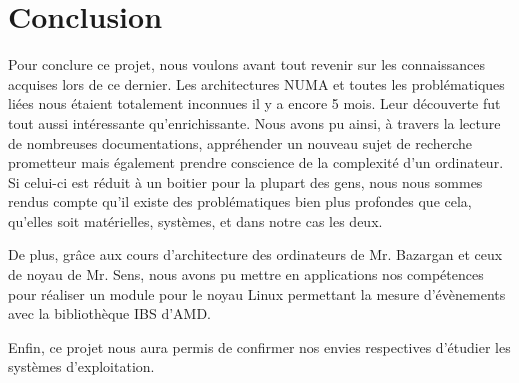 \pagestyle{plain}
\chapter*{Conclusion}

  Pour conclure ce projet, nous voulons avant tout revenir sur les connaissances
  acquises lors de ce dernier. Les architectures NUMA et toutes les
  problématiques liées nous étaient totalement inconnues il y a encore 5
  mois. Leur découverte fut tout aussi intéressante qu'enrichissante. Nous avons
  pu ainsi, à travers la lecture de nombreuses documentations, appréhender un
  nouveau sujet de recherche prometteur mais également prendre conscience de la
  complexité d'un ordinateur. Si celui-ci est réduit à un boitier pour la
  plupart des gens, nous nous sommes rendus compte qu'il existe des
  problématiques bien plus profondes que cela, qu'elles soit matérielles,
  systèmes, et dans notre cas les deux.\newline

  De plus, grâce aux cours d'architecture des ordinateurs de Mr. Bazargan et
  ceux de noyau de Mr. Sens, nous avons pu mettre en applications nos
  compétences pour réaliser un module pour le noyau Linux permettant la mesure
  d'évènements avec la bibliothèque IBS d'AMD.\newline

  Enfin, ce projet nous aura permis de confirmer nos envies respectives
  d'étudier les systèmes d'exploitation.



